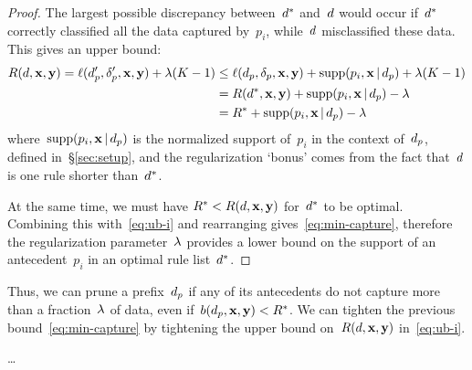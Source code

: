 \begin{proof}
The largest possible discrepancy between~$d^*$ and~${d}$ would occur
if~$d^*$ correctly classified all the data captured by~$p_i$,
while~${d}$ misclassified these data.
%
This gives an upper bound:
\begin{align}
\Obj(\RL, \x, \y) = \Loss(\Prefix', \Labels', \x, \y) + \Reg (K - 1)
&\le \Loss(\Prefix, \Labels, \x, \y) + \Supp(p_i, \x \given \Prefix) + \Reg(K - 1) \nn \\
&= \Obj(\OptimalRL, \x, \y) + \Supp(p_i, \x \given \Prefix) - \Reg \nn \\
&= \OptimalObj + \Supp(p_i, \x \given \Prefix) - \Reg
\label{eq:ub-i}
\end{align}
where~$\textnormal{supp}(p_i, \mathbf{x} \,|\, d_p)$ is the normalized support of~$p_i$
in the context of~$d_p$, defined in~\S\ref{sec:setup},
and the regularization `bonus' comes from the fact that~${d}$
is one rule shorter than~$d^*$.

At the same time, we must have ${R^* < R({d}, \mathbf{x}, \mathbf{y})}$ for~$d^*$ to be optimal.
%
Combining this with~\eqref{eq:ub-i} and rearranging gives~\eqref{eq:min-capture},
therefore the regularization parameter~${\lambda}$ provides a lower bound
on the support of an antecedent~$p_i$ in an optimal rule list~$d^*$.
\end{proof}

Thus, we can prune a prefix~$d_p$ if any of its antecedents do not capture
more than a fraction~${\lambda}$ of data, even if~${b(d_p, \mathbf{x}, \mathbf{y}) < R^*}$.
%
We can tighten the previous bound~\eqref{eq:min-capture}
by tightening the upper bound on~$R({d}, \mathbf{x}, \mathbf{y})$ in~\eqref{eq:ub-i}.

\begin{theorem}
\dots
\end{theorem}

